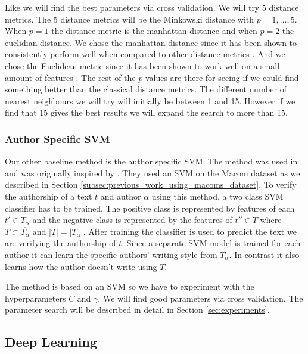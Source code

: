 Like \citet{US} we will find the best parameters via cross validation. We will
try 5 distance metrics. The 5 distance metrics will be the Minkowski distance
with $p = 1,\dots,5$. When $p = 1$ the distance metric is the manhattan distance
and when $p = 2$ the euclidian distance. We chose the manhattan distance since
it has been shown to consistently perform well when compared to other distance
metrics \citep{evert2015towards}. And we chose the Euclidean metric since it has
been shown to work well on a small amount of features \citep{evert2015towards}.
The rest of the $p$ values are there for seeing if we could find something
better than the classical distance metrics. The different number of nearest
neighbours we will try will initially be between 1 and 15. However if we find
that 15 gives the best results we will expand the search to more than 15.


\subsubsection{Author Specific SVM}

Our other baseline method is the author specific \gls{SVM}. The method
was used in \citep{US} and was originally inspired by \citet{hansen2014}.
They used an \gls{SVM} on the Macom dataset as we described in Section
\ref{subsec:previous_work_using_macoms_dataset}. To verify the authorship of a
text $t$ and author $\alpha$ using this method, a two class \gls{SVM} classifier
has to be trained. The positive class is represented by features of each $t' \in
T_\alpha$ and the negative class is represented by the features of $t'' \in T$
where $T \subset \overline{T_\alpha}$ and $|T| = |T_\alpha|$. After training the
classifier is used to predict the text we are verifying the authorship of $t$.
Since a separate \gls{SVM} model is trained for each author it can learn the
specific authors' writing style from $T_\alpha$. In contrast it also learns how
the author doesn't write using $T$.

The method is based on an \gls{SVM} so we have to experiment with the
hyperparameters $C$ and $\gamma$.\cite[E-Chapter 8]{Abu-Mostafa:2012:LD:2207825}
We will find good parameters via cross validation. The parameter search will be
described in detail in Section \ref{sec:experiments}.


\subsection{Deep Learning}


